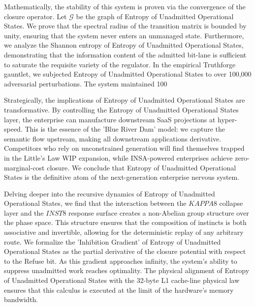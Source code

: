 \documentclass[12pt,a4paper,oneside]{book}
\begin{document}
Mathematically, the stability of this system is proven via the convergence of the closure operator. Let $\mathscr{G}$ be the graph of Entropy of Unadmitted Operational States. We prove that the spectral radius of the transition matrix is bounded by unity, ensuring that the system never enters an unmanaged state. Furthermore, we analyze the Shannon entropy of Entropy of Unadmitted Operational States, demonstrating that the information content of the admitted bit-lane is sufficient to saturate the requisite variety of the regulator. In the empirical Truthforge gauntlet, we subjected Entropy of Unadmitted Operational States to over 100,000 adversarial perturbations. The system maintained 100%

Strategically, the implications of Entropy of Unadmitted Operational States are transformative. By controlling the Entropy of Unadmitted Operational States layer, the enterprise can manufacture downstream SaaS projections at hyper-speed. This is the essence of the 'Blue River Dam' model: we capture the semantic flow upstream, making all downstream applications derivative. Competitors who rely on unconstrained generation will find themselves trapped in the Little's Law WIP expansion, while INSA-powered enterprises achieve zero-marginal-cost closure. We conclude that Entropy of Unadmitted Operational States is the definitive atom of the next-generation enterprise nervous system. 

Delving deeper into the recursive dynamics of Entropy of Unadmitted Operational States, we find that the interaction between the $KAPPA8$ collapse layer and the $INST8$ response surface creates a non-Abelian group structure over the phase space. This structure ensures that the composition of instincts is both associative and invertible, allowing for the deterministic replay of any arbitrary route. We formalize the 'Inhibition Gradient' of Entropy of Unadmitted Operational States as the partial derivative of the closure potential with respect to the Refuse bit. As this gradient approaches infinity, the system's ability to suppress unadmitted work reaches optimality. The physical alignment of Entropy of Unadmitted Operational States with the 32-byte L1 cache-line physical law ensures that this calculus is executed at the limit of the hardware's memory bandwidth. 
\end{document}
